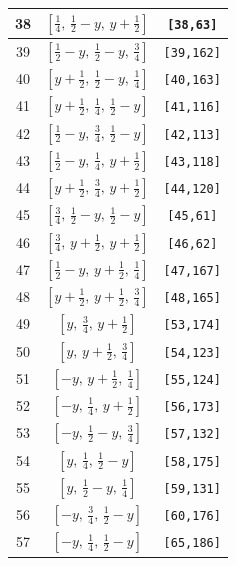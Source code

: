 \documentclass[fleqn,8pt]{jsarticle}
\begin{document}
\begin{longtable}{ccc}
38 & $\left[ \frac{1}{4},\, \frac{1}{2} - y,\, y + \frac{1}{2} \right]$ & {\tt [38,63]} \\ \hline
39 & $\left[ \frac{1}{2} - y,\, \frac{1}{2} - y,\, \frac{3}{4} \right]$ & {\tt [39,162]} \\ \hline
40 & $\left[ y + \frac{1}{2},\, \frac{1}{2} - y,\, \frac{1}{4} \right]$ & {\tt [40,163]} \\ \hline
41 & $\left[ y + \frac{1}{2},\, \frac{1}{4},\, \frac{1}{2} - y \right]$ & {\tt [41,116]} \\ \hline
42 & $\left[ \frac{1}{2} - y,\, \frac{3}{4},\, \frac{1}{2} - y \right]$ & {\tt [42,113]} \\ \hline
43 & $\left[ \frac{1}{2} - y,\, \frac{1}{4},\, y + \frac{1}{2} \right]$ & {\tt [43,118]} \\ \hline
44 & $\left[ y + \frac{1}{2},\, \frac{3}{4},\, y + \frac{1}{2} \right]$ & {\tt [44,120]} \\ \hline
45 & $\left[ \frac{3}{4},\, \frac{1}{2} - y,\, \frac{1}{2} - y \right]$ & {\tt [45,61]} \\ \hline
46 & $\left[ \frac{3}{4},\, y + \frac{1}{2},\, y + \frac{1}{2} \right]$ & {\tt [46,62]} \\ \hline
47 & $\left[ \frac{1}{2} - y,\, y + \frac{1}{2},\, \frac{1}{4} \right]$ & {\tt [47,167]} \\ \hline
48 & $\left[ y + \frac{1}{2},\, y + \frac{1}{2},\, \frac{3}{4} \right]$ & {\tt [48,165]} \\ \hline
49 & $\left[ y,\, \frac{3}{4},\, y + \frac{1}{2} \right]$ & {\tt [53,174]} \\ \hline
50 & $\left[ y,\, y + \frac{1}{2},\, \frac{3}{4} \right]$ & {\tt [54,123]} \\ \hline
51 & $\left[ - y,\, y + \frac{1}{2},\, \frac{1}{4} \right]$ & {\tt [55,124]} \\ \hline
52 & $\left[ - y,\, \frac{1}{4},\, y + \frac{1}{2} \right]$ & {\tt [56,173]} \\ \hline
53 & $\left[ - y,\, \frac{1}{2} - y,\, \frac{3}{4} \right]$ & {\tt [57,132]} \\ \hline
54 & $\left[ y,\, \frac{1}{4},\, \frac{1}{2} - y \right]$ & {\tt [58,175]} \\ \hline
55 & $\left[ y,\, \frac{1}{2} - y,\, \frac{1}{4} \right]$ & {\tt [59,131]} \\ \hline
56 & $\left[ - y,\, \frac{3}{4},\, \frac{1}{2} - y \right]$ & {\tt [60,176]} \\ \hline
57 & $\left[ - y,\, \frac{1}{4},\, \frac{1}{2} - y \right]$ & {\tt [65,186]} \\ \hline

\end{longtable}
\end{document}

